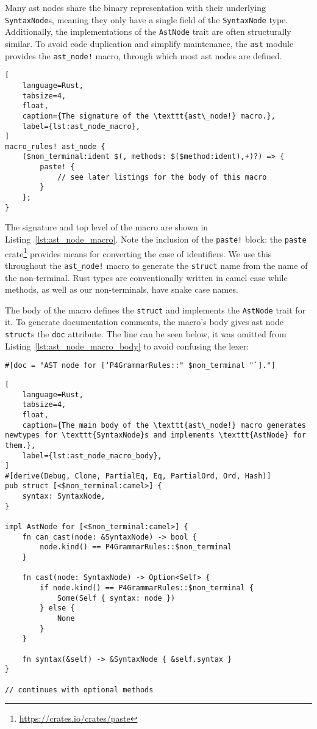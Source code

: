 Many \acrshort{ast} nodes share the binary representation with their underlying
\texttt{SyntaxNode}s, meaning they only have a single field of the
\texttt{SyntaxNode} type. Additionally, the implementations of the
\texttt{AstNode} trait are often structurally similar. To avoid code duplication
and simplify maintenance, the \texttt{ast} module provides the
\texttt{ast\_node!} macro, through which most \acrshort{ast} nodes are defined.

\begin{lstlisting}[
	language=Rust,
	tabsize=4,
	float,
	caption={The signature of the \texttt{ast\_node!} macro.},
	label={lst:ast_node_macro},
]
macro_rules! ast_node {
	($non_terminal:ident $(, methods: $($method:ident),+)?) => {
		paste! {
			// see later listings for the body of this macro
		}
	};
}
\end{lstlisting}

The signature and top level of the macro are shown in
Listing~\ref{lst:ast_node_macro}. Note the inclusion of the \texttt{paste!}
block: the \texttt{paste} crate\footnote{\url{https://crates.io/crates/paste}}
provides means for converting the case of identifiers. We use this throughout
the \texttt{ast\_node!} macro to generate the \texttt{struct} name from the name
of the non-terminal. Rust types are conventionally written in camel case while
methods, as well as our non-terminals, have snake case names.

The body of the macro defines the \texttt{struct} and implements the
\texttt{AstNode} trait for it. To generate documentation comments, the macro's
body gives \acrshort{ast} node \texttt{struct}s the \texttt{doc} attribute. The
line can be seen below, it was omitted from
Listing~\ref{lst:ast_node_macro_body} to avoid confusing the lexer:

\texttt{\#[doc = "AST node for [`P4GrammarRules::" \$non\_terminal "`]."]}

\begin{lstlisting}[
	language=Rust,
	tabsize=4,
	float,
	caption={The main body of the \texttt{ast\_node!} macro generates newtypes for \texttt{SyntaxNode}s and implements \texttt{AstNode} for them.},
	label={lst:ast_node_macro_body},
]
#[derive(Debug, Clone, PartialEq, Eq, PartialOrd, Ord, Hash)]
pub struct [<$non_terminal:camel>] {
	syntax: SyntaxNode,
}

impl AstNode for [<$non_terminal:camel>] {
	fn can_cast(node: &SyntaxNode) -> bool {
		node.kind() == P4GrammarRules::$non_terminal
	}

	fn cast(node: SyntaxNode) -> Option<Self> {
		if node.kind() == P4GrammarRules::$non_terminal {
			Some(Self { syntax: node })
		} else {
			None
		}
	}

	fn syntax(&self) -> &SyntaxNode { &self.syntax }
}

// continues with optional methods
\end{lstlisting}


